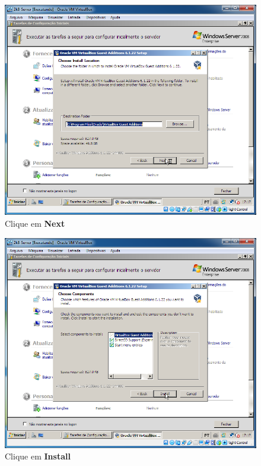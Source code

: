 \documentclass[10pt]{article}
\begin{document}
\begin{figure}[H]
    \centering
    \caption{Clique em \textbf{Next}}
    \label{fig:3133}
    \includegraphics[width=\linewidth]{images/ativacao_das_maquinas_virtuais/configuracao_inicial_das_maquinas_virtuais/033.png}
\end{figure}
\begin{figure}[H]
    \centering
    \caption{Clique em \textbf{Install}}
    \label{fig:3134}
    \includegraphics[width=\linewidth]{images/ativacao_das_maquinas_virtuais/configuracao_inicial_das_maquinas_virtuais/034.png}
\end{figure}
\end{document}
